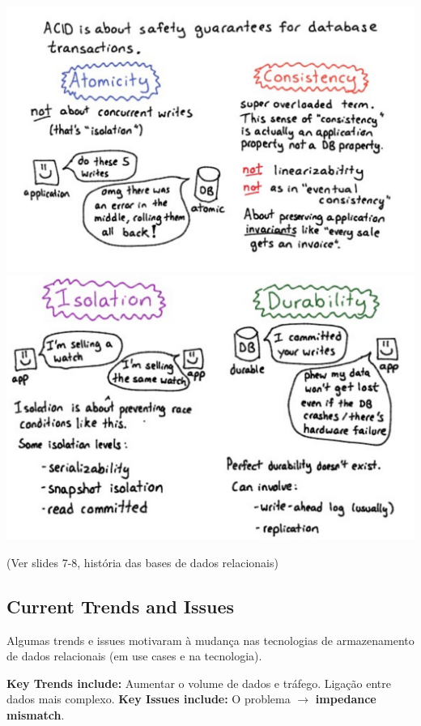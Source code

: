 \documentclass{article}
\begin{document}
\begin{center}
  \includegraphics[scale=0.3]{2}
  \includegraphics[scale=0.3]{3}
\end{center}

(Ver slides 7-8, história das bases de dados relacionais)

\pagebreak


\subsection{Current Trends and Issues}

\begin{flushleft}
  Algumas trends e issues motivaram à mudança nas tecnologias de armazenamento
de dados relacionais (em use cases e na tecnologia).

\textbf{Key Trends include:} Aumentar o volume de dados e tráfego. Ligação entre dados mais complexo.
\textbf{Key Issues include:} O problema $\rightarrow$ \textbf{impedance mismatch}.
\end{flushleft}
\end{document}
